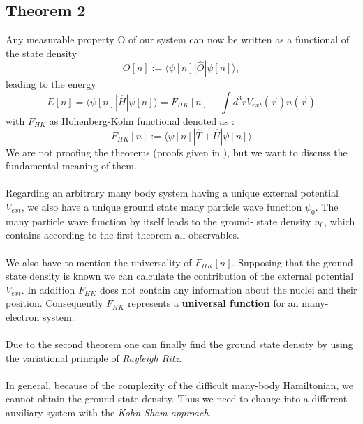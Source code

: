 		\subsection*{Theorem 2}
			Any measurable property O of our system can now be written as a functional of the state density
			\begin{equation}
				O[n] := \langle \psi[n] | \hat O | \psi[n] \rangle,
			\end{equation}
			leading to the energy
			\begin{equation}
				E[n] = \langle \psi[n] | \hat H | \psi[n] \rangle = F_{HK}[n] + \int d^3 r V_{ext}(\vec{r}) n(\vec{r}) 
				\label{eq:EnergyFunctional}
			\end{equation}
			with $F_{HK}$ as Hohenberg-Kohn functional denoted as :
			\begin{equation}
				F_{HK}[n] := \langle \psi[n] | \hat T + \hat U | \psi[n] \rangle
			\end{equation}	
		We are not proofing the theorems (proofs given in \cite{ElectronicStructureBook}), but we want to discuss the fundamental meaning of them. \\\\
		Regarding an arbitrary many body system having a unique external potential $V_{ext}$, we also have a unique ground state many particle wave function $\psi_0$. The many particle wave function by itself leads to the ground- state density $n_0$, which contains according to the first theorem all observables. \\\\
		We also have to mention the universality of $F_{HK}[n]$. Supposing that the ground state density is known we can calculate the contribution of the external potential $V_{ext}$. In addition $F_{HK}$ does not contain any information about the nuclei and their position. Consequently $F_{HK}$ represents a \textbf{universal function} for an many-electron system. \\\\
		Due to the second theorem one can finally find the ground state density by using the variational principle of \textit{Rayleigh Ritz}.\\\\
		In general, because of the complexity of the difficult many-body Hamiltonian, we cannot obtain the ground state density. Thus we need to change into a different auxiliary system with the \textit{Kohn Sham approach}.			

